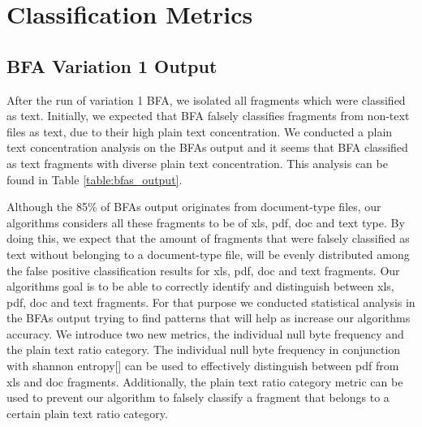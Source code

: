 \chapter{Classification  Metrics}
\section{BFA Variation 1 Output}
After the run of variation 1 BFA, we isolated all fragments which were classified as text. Initially, we expected that BFA falsely classifies fragments from non-text files as text, due to their high plain text concentration. We conducted a plain text concentration analysis on the BFAs output and it seems that BFA classified as text fragments with diverse plain text concentration. This analysis can be found in Table \ref{table:bfas_output}.


 Although the 85\% of BFAs output  originates from document-type files, our algorithms considers all these fragments to be of xls, pdf, doc and text type. By doing this, we expect that the amount of fragments that were falsely classified as text without belonging to a document-type file, will be evenly distributed among the false positive classification results for xls, pdf, doc and text fragments. Our algorithms goal is to be able to correctly identify and distinguish between xls, pdf, doc and text fragments. For that purpose we conducted statistical analysis in the BFAs output trying to find patterns that will help as increase our algorithms accuracy. We introduce two new metrics, the individual null byte frequency and the plain text ratio category.  The individual null byte frequency in conjunction with shannon entropy[] can be used to effectively distinguish  between pdf from xls and doc fragments. Additionally, the plain text ratio category metric can be used to prevent our algorithm to falsely classify a fragment that belongs to a certain plain text ratio category.


